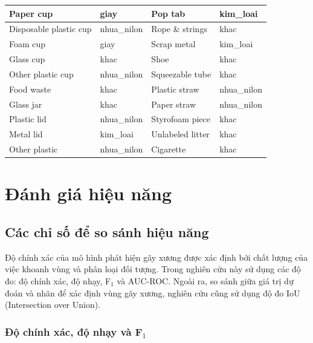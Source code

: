 \documentclass[../the.tex]{subfiles}
\begin{document}
\begin{table}[!ht]
\begin{tabular}{|l|l|l|l|}
        Paper cup & giay & Pop tab & kim\_loai \\ \hline
        Disposable plastic cup & nhua\_nilon & Rope \& strings & khac \\ \hline
        Foam cup & giay & Scrap metal & kim\_loai \\ \hline
        Glass cup & khac & Shoe & khac \\ \hline
        Other plastic cup & nhua\_nilon & Squeezable tube & khac \\ \hline
        Food waste & khac & Plastic straw & nhua\_nilon \\ \hline
        Glass jar & khac & Paper straw & nhua\_nilon \\ \hline
        Plastic lid & nhua\_nilon & Styrofoam piece & khac \\ \hline
        Metal lid & kim\_loai & Unlabeled litter & khac \\ \hline
        Other plastic & nhua\_nilon & Cigarette & khac \\ \hline
    \end{tabular}
	\label{tab:taco_map}
\end{table}
\section{Đánh giá hiệu năng}
\label{sec:eval}



\subsection{Các chỉ số để so sánh hiệu năng}

{\fontsize{13}{12} \selectfont
	Độ chính xác của mô hình phát hiện gãy xương được xác định bởi chất lượng của việc khoanh vùng và phân loại đối tượng. Trong nghiên cứu này sử dụng các độ đo: độ chính xác, độ nhạy, F$_1$ và AUC-ROC. Ngoài ra, so sánh giữa giá trị dự đoán và nhãn để xác định vùng gãy xương, nghiên cứu cũng sử dụng độ đo IoU (Intersection over Union).
}

\subsubsection*{Độ chính xác, độ nhạy và F$_1$}
\end{document}

